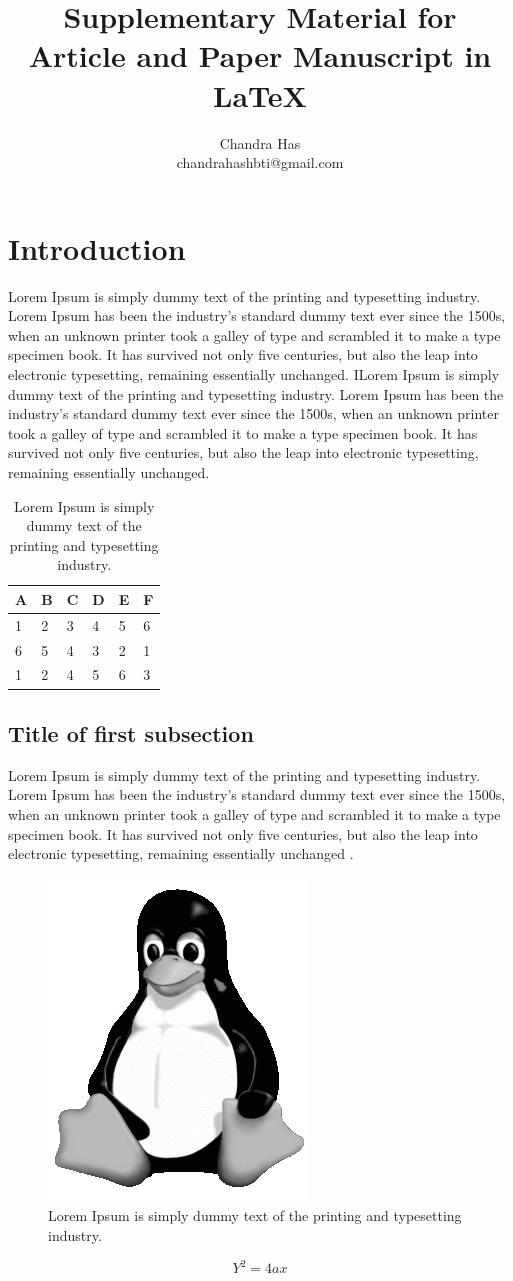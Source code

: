 \documentclass[10pt, a4paper]{article}
\title{\vspace{-15mm} {\normalsize Supplementary Material for}\\
	     Article and Paper Manuscript in \LaTeX}
\author{Chandra Has\\ chandrahashbti@gmail.com}
\begin{document}
\maketitle

\section{Introduction}
Lorem Ipsum is simply dummy text of the printing and typesetting industry. Lorem Ipsum has been the industry's standard dummy text ever since the 1500s, when an unknown printer took a galley of type and scrambled it to make a type specimen book. It has survived not only five centuries, but also the leap into electronic typesetting, remaining essentially unchanged. ILorem Ipsum is simply dummy text of the printing and typesetting industry. Lorem Ipsum has been the industry's standard dummy text ever since the 1500s, when an unknown printer took a galley of type and scrambled it to make a type specimen book. It has survived not only five centuries, but also the leap into electronic typesetting, remaining essentially unchanged. 

\begin{table}[h]
	\centering
	\caption{Lorem Ipsum is simply dummy text of the printing and typesetting industry.}
	\label{tab: table-1}
	\begin{tabular}{p{1cm}p{1cm}p{1cm}p{1cm}p{1cm}p{1cm}}
		\hline 
		A & B &  C &  D & E & F \\ 
		\hline 
		1 & 2 & 3 & 4 & 5 & 6 \\ 	
		6 & 5 & 4 & 3 & 2 & 1 \\ 		
		1 & 2 & 4 & 5 & 6 & 3 \\ 	
		\hline 
	\end{tabular} 	
\end{table}  

\subsection{Title of first subsection}
Lorem Ipsum is simply dummy text of the printing and typesetting industry. Lorem Ipsum has been the industry's standard dummy text ever since the 1500s, when an unknown printer took a galley of type and scrambled it to make a type specimen book. It has survived not only five centuries, but also the leap into electronic typesetting, remaining essentially unchanged \cite{Magnetism}.

\begin{figure}[h]
	\centering
	\includegraphics[width=0.25\linewidth]{gfx}
	\caption{Lorem Ipsum is simply dummy text of the printing and typesetting industry.}
	\label{fig:logo}
\end{figure}

\begin{equation}
Y^2 = 4ax
\end{equation}



\end{document}
